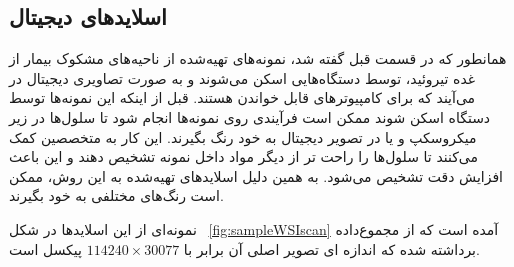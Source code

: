 \subsection{اسلاید‌های دیجیتال}\label{subsec:اسلاید-های-دیجیتال}
همانطور که در قسمت قبل گفته شد، نمونه‌های تهیه‌شده از ناحیه‌های مشکوک بیمار از غده تیروئید، توسط دستگاه‌هایی اسکن می‌شوند و به صورت تصاویری دیجیتال در می‌آیند که برای کامپیوتر‌های قابل خواندن هستند.
قبل از اینکه این نمونه‌ها توسط دستگاه اسکن شوند ممکن است فرآیندی روی نمونه‌ها انجام شود تا سلول‌ها در زیر میکروسکپ و یا در تصویر دیجیتال به خود رنگ بگیرند.
این کار به متخصصین کمک می‌کنند تا سلول‌ها را راحت تر از دیگر مواد داخل نمونه تشخیص دهند و این باعث افزایش دقت تشخیص می‌شود.
به همین دلیل اسلاید‌های تهیه‌شده به این روش، ممکن است رنگ‌های مختلفی به خود بگیرند.


نمونه‌ای از این اسلاید‌ها در شکل ~\autoref{fig:sampleWSIscan} آمده است که از مجموع‌داده \cite{ncigdc} برداشته شده که اندازه ای تصویر اصلی آن برابر با
 $114240\times30077$
 پیکسل است.

